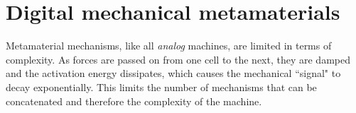 \chapter{Digital mechanical metamaterials}
\label{chapter:digital}









Metamaterial mechanisms, like all \textit{analog} machines, are limited in terms of complexity. As forces are passed on from one cell to the next, they are damped and the activation energy dissipates, which causes the mechanical ``signal" to decay exponentially. This limits the number of mechanisms that can be concatenated and therefore the complexity of the machine.

